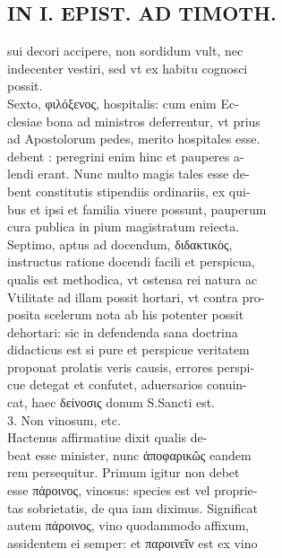 \documentclass{article}
\begin{document}
\begin{pages}
\section*{IN I. EPIST. AD TIMOTH. \\
                }
sui decori accipere, non sordidum vult, nec \\
                indecenter vestiri, sed vt ex habitu cognosci \\
                possit. \\
                Sexto, φιλόξενος, hospitalis: cum enim Ec- \\
                clesiae bona ad ministros deferrentur, vt prius \\
                ad Apostolorum pedes, merito hospitales esse. \\
                debent : peregrini enim hinc et pauperes a- \\
                lendi erant. Nunc multo magis tales esse de- \\
                bent constitutis stipendiis ordinariis, ex qui- \\
                bus et ipsi et familia viuere possunt, pauperum \\
                cura publica in pium magistratum reiecta. \\
                Septimo, aptus ad docendum, διδακτικὸς, \\
                instructus ratione docendi facili et perspicua, \\
                qualis est methodica, vt ostensa rei natura ac \\
                Vtilitate ad illam possit hortari, vt contra pro- \\
                posita scelerum nota ab his potenter possit \\
                dehortari: sic in defendenda sana doctrina \\
                didacticus est si pure et perspicue veritatem \\
                proponat prolatis veris causis, errores perspi- \\
                cue detegat et confutet, aduersarios conuin- \\
                cat, haec δείνοσις donum S.Sancti est. \\
                3. Non vinosum, etc. \\
                Hactenus affirmatiue dixit qualis de- \\
                beat esse minister, nunc ἀποφαρικῶς eandem \\
                rem persequitur. Primum igitur non debet \\
                esse πάροινος, vinosus: species est vel proprie- \\
                tas sobrietatis, de qua iam diximus. Significat \\
                autem πάροινος, vino quodammodo affixum, \\
                assidentem ei semper: et παροινεῖν est ex vino \\
                

\end{pages}
\end{document}
